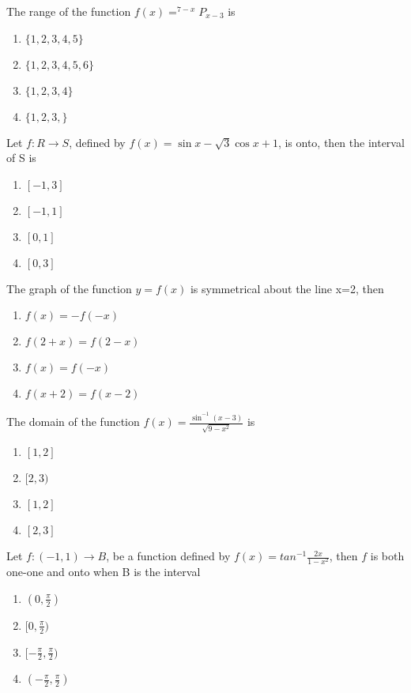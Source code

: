 \item The range of the function $f(x)= ^{7-x}P_{x-3}$ is
\begin{enumerate}
\item $\{1,2,3,4,5\}$
\item $\{1,2,3,4,5,6\}$
\item $\{1,2,3,4\}$
\item $\{1,2,3,\}$
\end{enumerate}

\item Let $f: R \rightarrow S$, defined by $f(x)=\sin x-\sqrt{3}\cos x+1$, is onto, then the interval of S is
\begin{enumerate}
\item $[-1,3]$
\item $[-1,1]$
\item $[0,1]$
\item $[0,3]$
\end{enumerate}

\item The graph of the function $y=f(x)$ is symmetrical about the line x=2, then
\begin{enumerate}
\item $f(x)=-f(-x)$
\item $f(2+x)=f(2-x)$
\item $f(x)=f(-x)$
\item $f(x+2)=f(x-2)$
\end{enumerate}

\item The domain of the function $f(x)=\frac{\sin^{-1}(x-3)}{\sqrt{9-x^{2}}}$ is
\begin{enumerate}
\item $[1,2]$
\item $[2,3)$
\item $[1,2]$
\item $[2,3]$
\end{enumerate}

\item Let $f: (-1,1) \rightarrow B$, be a function defined by $f(x)=tan^{-1}\frac{2x}{1-x^2}$, then $f$ is both one-one and onto when B is the interval
\begin{enumerate}
\item $(0,\frac{\pi}{2})$
\item $[0,\frac{\pi}{2})$
\item $[-\frac{\pi}{2},\frac{\pi}{2})$
\item $(-\frac{\pi}{2},\frac{\pi}{2})$
\end{enumerate}

